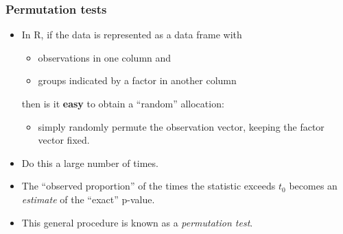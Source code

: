 \documentclass[a4paper]{article}\usepackage[]{graphicx}\usepackage[]{xcolor}
\begin{document}
\subsubsection{Permutation tests}
\begin{itemize}
	\item In R, if the data is represented as a data frame with
	\begin{itemize}
		\item observations in one column and
		\item groups indicated by a factor in another column
	\end{itemize}
	then is it \textbf{easy} to obtain a ``random'' allocation:
	\begin{itemize}
		\item simply randomly permute the observation vector, keeping the factor vector fixed.
	\end{itemize}
	\item Do this a large number of times.
	\item The ``observed proportion'' of the times the statistic exceeds \( t_0 \) becomes an \textit{estimate} of the ``exact'' p-value.
	\item This general procedure is known as a \textit{permutation test}.
\end{itemize}
\end{document}
